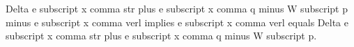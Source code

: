 Delta e subscript x comma str plus e subscript x comma q minus W subscript p minus e subscript x comma verl implies e subscript x comma verl equals Delta e subscript x comma str plus e subscript x comma q minus W subscript p.
